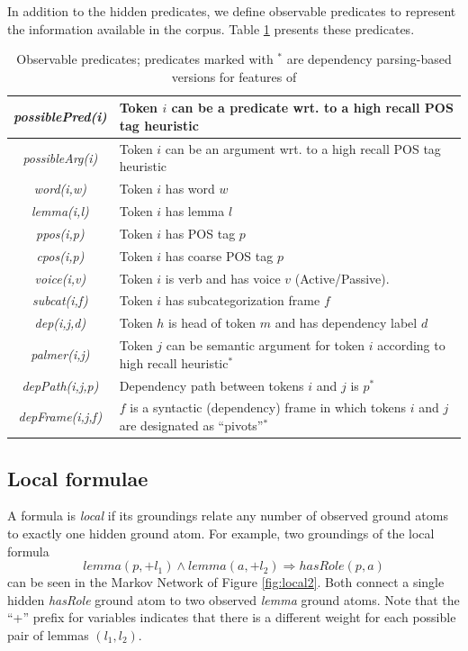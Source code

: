 In addition to the hidden predicates, we define observable predicates to
represent the information available in the corpus. Table \ref{tbl:o_preds}
presents these predicates. 
\begin{table}
    \small
    \centering
    \begin{tabular}{|c|p{5cm}|}
        \hline
    \emph{possiblePred(i)} & Token $i$ can be a predicate wrt. to a high recall POS tag heuristic\\\hline
    \emph{possibleArg(i)} &  Token $i$ can be an argument wrt. to a high recall POS tag heuristic\\\hline\hline
    \emph{word(i,w)}    & Token $i$ has word $w$\\\hline
    \emph{lemma(i,l)}   & Token $i$ has lemma $l$\\\hline
    \emph{ppos(i,p)}    & Token $i$ has POS tag $p$\\\hline
    \emph{cpos(i,p)}    & Token $i$ has coarse POS tag $p$\\\hline
    \emph{voice(i,v)}   & Token $i$ is verb and has voice $v$ (Active/Passive).\\\hline
    \emph{subcat(i,f)} & Token $i$ has subcategorization frame $f$\\\hline\hline
    \emph{dep(i,j,d)}     & Token $h$ is head of token $m$ and has dependency label $d$\\\hline
    \emph{palmer(i,j)}  & Token $j$ can be semantic argument for token $i$ according to high recall heuristic$^*$\\\hline
    \emph{depPath(i,j,p)}      & Dependency path between tokens $i$ and $j$ is $p$$^*$\\\hline
    \emph{depFrame(i,j,f)}     & $f$ is a syntactic (dependency) frame in which tokens $i$ and $j$ are designated as ``pivots''$^*$\\\hline
    \end{tabular}
    \caption{Observable predicates; predicates marked with $^*$ are dependency parsing-based versions for features of  }
    \label{tbl:o_preds}
\end{table}

\subsection{Local formulae}
\label{sec:local}

A formula is \emph{local} if its groundings relate any number of observed ground atoms to exactly one hidden ground atom. For example, two groundings of the local formula 
\[lemma(p,+l_1) \wedge lemma(a,+l_2) \Rightarrow hasRole(p,a)\]
can be seen in the Markov Network of Figure \ref{fig:local2}. Both connect a single  hidden \emph{hasRole} ground atom to two observed \emph{lemma} ground atoms. Note that the ``+'' prefix for variables indicates that there is a different weight for each possible pair of lemmas $(l_1,l_2)$.


